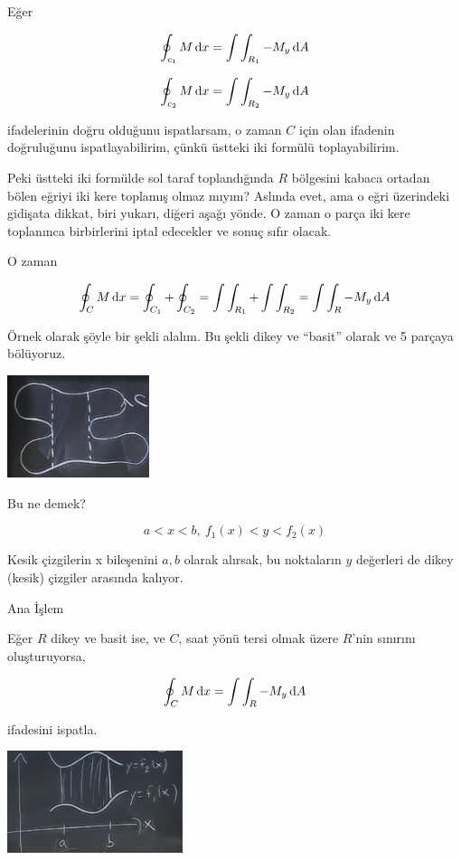 \documentclass[12pt,fleqn]{article}\usepackage{../../common}
\begin{document}
Eğer 

$$ \oint_{c_1} M \,\mathrm{d} x  = \int \int_{R_1} -M_y \,\mathrm{d} A $$

$$ \oint_{c_2} M \,\mathrm{d} x  = \int \int_{R_2} -M_y \,\mathrm{d} A $$

ifadelerinin doğru olduğunu ispatlarsam, o zaman $C$ için olan ifadenin
doğruluğunu ispatlayabilirim, çünkü üstteki iki formülü toplayabilirim. 

Peki üstteki iki formülde sol taraf toplandığında $R$ bölgesini kabaca
ortadan bölen eğriyi iki kere toplamış olmaz mıyım? Aslında evet, ama o
eğri üzerindeki gidişata dikkat, biri yukarı, diğeri aşağı yönde. O zaman o
parça iki kere toplanınca birbirlerini iptal edecekler ve sonuç sıfır olacak.

O zaman 

$$
\oint_C M \,\mathrm{d} x = \oint_{C_1} + \oint_{C_2} =
\int \int_{R_1} + \int \int_{R_2} = \int \int_R -M_y \,\mathrm{d} A
$$

Örnek olarak şöyle bir şekli alalım. Bu şekli dikey ve ``basit'' olarak ve
5 parçaya bölüyoruz.

\begin{center}
\includegraphics[height=3cm]{22_6.png}
\end{center}

Bu ne demek? 

$$ a < x < b, \ f_1(x) < y < f_2(x) $$

Kesik çizgilerin x bileşenini $a,b$ olarak alırsak, bu noktaların $y$
değerleri de dikey (kesik) çizgiler arasında kalıyor. 

Ana İşlem

Eğer $R$ dikey ve basit ise, ve $C$, saat yönü tersi olmak üzere $R$'nin
sınırını oluşturuyorsa, 

$$ \oint_C M \,\mathrm{d} x  = \int \int_R -M_y \,\mathrm{d} A $$

ifadesini ispatla. 

\begin{center}
\includegraphics[height=3cm]{22_7.png}
\end{center}
\end{document}
